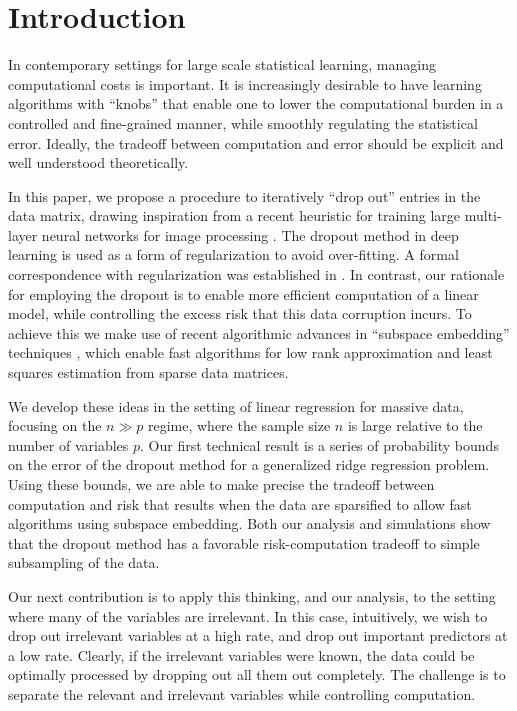 \section{Introduction}



In contemporary settings for large scale statistical learning,
managing computational costs is important.
It is increasingly desirable to have learning
algorithms with ``knobs'' that enable one to lower the computational
burden in a controlled and fine-grained manner, while smoothly
regulating the statistical error.  Ideally, the tradeoff between
computation and error should be explicit and well understood theoretically.

In this paper, we propose a procedure to iteratively ``drop out''
entries in the data matrix, drawing inspiration from a recent
heuristic for training large multi-layer neural networks for image
processing \citep{Hinton:2012}.  The dropout method in deep learning is
used as a form of regularization to avoid over-fitting.  A formal
correspondence with regularization was established in \cite{Wager:2013}.
In contrast, our rationale for employing the dropout is to enable more
efficient computation of a linear model, while controlling the excess
risk that this data corruption incurs.  To achieve this we make use of recent algorithmic advances in
``subspace embedding'' techniques \citep{Clarkson:2012,Nelson:2012},
which enable fast algorithms for low rank approximation and least
squares estimation from sparse data matrices.

We develop these ideas in the setting of linear regression for massive
data, focusing on the $n\gg p$ regime, where the sample size $n$ is
large relative to the number of variables $p$.  Our first technical
result is a series of probability bounds on the error of the dropout
method for a generalized ridge regression problem.  Using these
bounds, we are able to make precise the tradeoff between computation
and risk that results when the data are sparsified to allow fast
algorithms using subspace embedding.  Both our analysis and
simulations show that the dropout method has a favorable
risk-computation tradeoff to simple subsampling of the data.

Our next contribution is to apply this thinking, and our analysis, to
the setting where many of the variables are irrelevant.  
In this case, intuitively, we wish to drop out irrelevant variables at a high rate, and drop
out important predictors at a low rate.  Clearly, if the 
irrelevant variables were known, the data could be optimally processed by
dropping out all them out completely.  The challenge is to
separate the relevant and irrelevant variables while controlling
computation.

